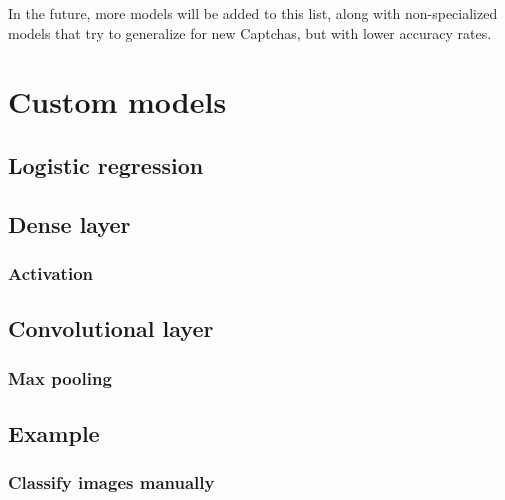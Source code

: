 \documentclass[article,nojss]{jss}
\begin{document}
In the future, more models will be added to this list, along with
non-specialized models that try to generalize for new Captchas, but with
lower accuracy rates.

\hypertarget{custom}{%
\section{Custom models}\label{custom}}

\lipsum[2]

\hypertarget{logistic-regression}{%
\subsection{Logistic regression}\label{logistic-regression}}

\lipsum[2]

\hypertarget{dense-layer}{%
\subsection{Dense layer}\label{dense-layer}}

\lipsum[2]

\hypertarget{activation}{%
\subsubsection{Activation}\label{activation}}

\lipsum[2]

\hypertarget{convolutional-layer}{%
\subsection{Convolutional layer}\label{convolutional-layer}}

\lipsum[2]

\hypertarget{max-pooling}{%
\subsubsection{Max pooling}\label{max-pooling}}

\lipsum[2]

\hypertarget{example}{%
\subsection{Example}\label{example}}

\lipsum[2]

\hypertarget{classify-images-manually}{%
\subsubsection{Classify images
manually}\label{classify-images-manually}}
\end{document}
